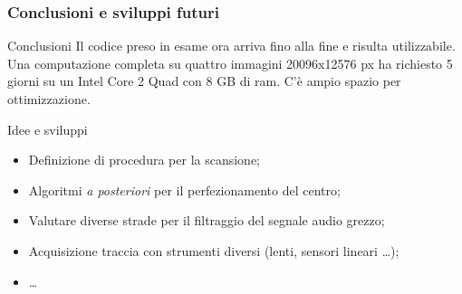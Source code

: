 \begin{frame}
\frametitle{Conclusioni e sviluppi futuri}
\begin{block}{Conclusioni}
Il codice preso in esame ora arriva fino alla fine e risulta utilizzabile.
Una computazione completa su quattro immagini 20096x12576 px ha richiesto 5 giorni su 
un Intel Core 2 Quad con 8 GB di ram. C'\`e ampio spazio per ottimizzazione.
\end{block}

\begin{block}{Idee e sviluppi}
\begin{itemize}
\item Definizione di procedura per la scansione;
\item Algoritmi \emph{a posteriori} per il perfezionamento del centro;
\item Valutare diverse strade per il filtraggio del segnale audio grezzo;
\item Acquisizione traccia con strumenti diversi (lenti, sensori lineari \dots);
\item \dots
\end{itemize}

\end{block}
\end{frame}
